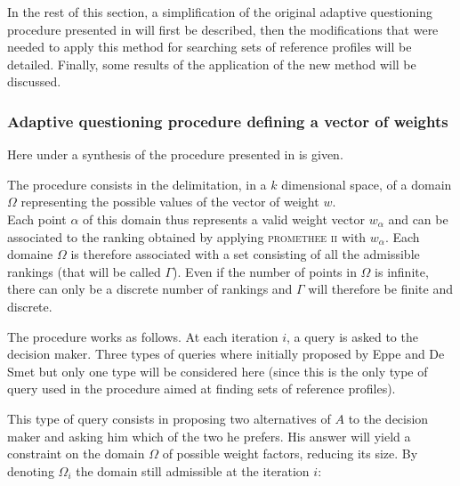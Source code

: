 In the rest of this section, a simplification of the original adaptive questioning procedure presented in \cite{eppe2014adaptive} will first be described, then the modifications that were needed to apply this method for searching sets of reference profiles will be detailed.
Finally, some results of the application of the new method will be discussed.

\subsubsection{Adaptive questioning procedure defining a vector of weights}

Here under a synthesis of the procedure presented in \cite{eppe2014adaptive} is given.

The procedure consists in the delimitation, in a $k$ dimensional space, of a domain $\Omega$ representing the possible values of the vector of weight $w$. \\
Each point $\alpha$ of this domain thus represents a valid weight vector $w_{\alpha}$ and can be associated to the ranking obtained by applying \textsc{promethee ii} with $w_{\alpha}$.
Each domaine $\Omega$ is therefore associated with a set consisting of all the admissible rankings (that will be called $\Gamma$).
Even if the number of points in $\Omega$ is infinite, there can only be a discrete number of rankings and $\Gamma$ will therefore be finite and discrete.

The procedure works as follows.
At each iteration $i$, a query is asked to the decision maker.
Three types of queries where initially proposed by Eppe and De Smet but only one type will be considered here (since this is the only type of query used in the procedure aimed at finding sets of reference profiles).

This type of query consists in proposing two alternatives of $A$ to the decision maker and asking him which of the two he prefers.
His answer will yield a constraint on the domain $\Omega$ of possible weight factors, reducing its size.
By denoting $\Omega_i$ the domain still admissible at the iteration $i$:

